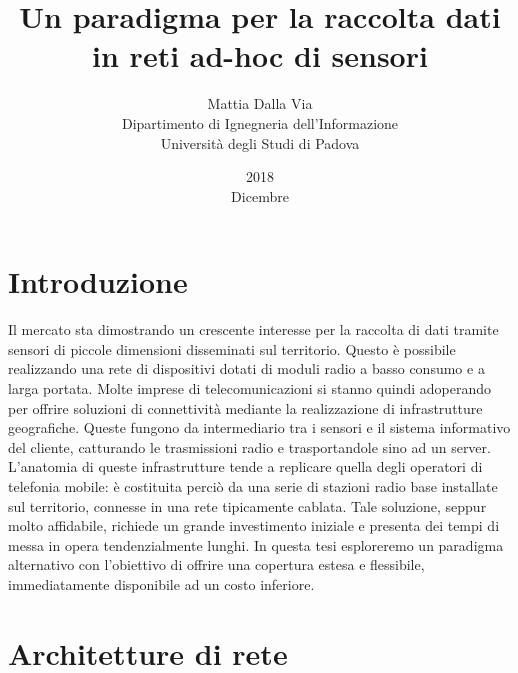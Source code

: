\documentclass[a4paper,12pt]{article}
\title{Un paradigma per la raccolta dati in reti ad-hoc di sensori}
\date{2018\\ Dicembre}
\author{Mattia Dalla Via\\ Dipartimento di Ignegneria dell'Informazione\\ Università degli Studi di Padova}
\theoremstyle{definition}
\begin{document}
\maketitle

\clearpage

\tableofcontents

\section{Introduzione}

Il mercato sta dimostrando un crescente interesse per la raccolta di dati tramite sensori di piccole dimensioni disseminati sul territorio. Questo è possibile realizzando una rete di dispositivi dotati di moduli radio a basso consumo e a larga portata. Molte imprese di telecomunicazioni si stanno quindi adoperando per offrire soluzioni di connettività mediante la realizzazione di infrastrutture geografiche. Queste fungono da intermediario tra i sensori e il sistema informativo del cliente, catturando le trasmissioni radio e trasportandole sino ad un server. L'anatomia di queste infrastrutture tende a replicare quella degli operatori di telefonia mobile: è costituita perciò da una serie di stazioni radio base installate sul territorio, connesse in una rete tipicamente cablata. Tale soluzione, seppur molto affidabile, richiede un grande investimento iniziale e presenta dei tempi di messa in opera tendenzialmente lunghi. In questa tesi esploreremo un paradigma alternativo con l'obiettivo di offrire una copertura estesa e flessibile, immediatamente disponibile ad un costo inferiore.



\section{Architetture di rete}
\end{document}

